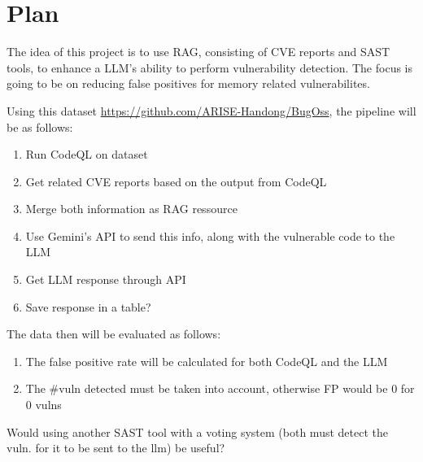 \section{Plan}
\label{sec:plan}
The idea of this project is to use RAG, consisting of CVE reports and SAST tools, to enhance a LLM's ability to perform vulnerability detection.
The focus is going to be on reducing false positives for memory related vulnerabilites.

Using this dataset \url{https://github.com/ARISE-Handong/BugOss}, the pipeline will be as follows:

\begin{enumerate}
    \item Run CodeQL on dataset
    \item Get related CVE reports based on the output from CodeQL
    \item Merge both information as RAG ressource
    \item Use Gemini's API to send this info, along with the vulnerable code to the LLM
    \item Get LLM response through API
    \item Save response in a table?
\end{enumerate}

The data then will be evaluated as follows:

\begin{enumerate}
    \item The false positive rate will be calculated for both CodeQL and the LLM
    \item The \#vuln detected must be taken into account, otherwise FP would be 0 for 0 vulns
\end{enumerate}

Would using another SAST tool with a voting system (both must detect the vuln. for it to be sent to the llm) be useful?
